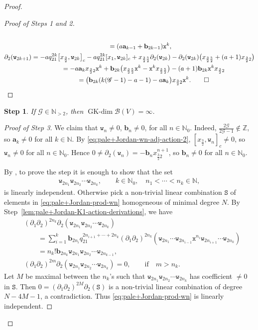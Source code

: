 \documentclass[10pt,a4paper]{amsart}
\providecommand{\qed}{\ensuremath{\square}}
\numberwithin{equation}{section}
\newtheorem{stepiv}{Step}
\newcommand{\GK}{\operatorname{GK-dim}}
\newcommand{\toba}{\mathscr B}
\newcommand{\ghost}{\mathscr{G}}
\newcommand{\ab}{\mathbf a}
\newcommand{\bb}{\mathbf b}
\newcommand{\N}{{\mathbb N}}
\newcommand{\Z}{{\mathbb Z}}
\newcommand{\wt}{\mathtt{w}}
\newcommand{\xt}{\mathtt{x}}
\newcommand{\tresdos}{\frac{3}{2}}
\newcommand{\cincodos}{\frac{5}{2}}
\begin{document}
\begin{proof}
\begin{proof}[Proof of Steps 1 and 2]
\begin{gather*}
\\\hphantom{\partial_{2} (\wt_{2k})}
{}= (a\ab_{k-1} +\bb_{2k-1}) \xt^{k},
\\
\partial_{2} (\wt_{2k+1}) =
-aq_{21}^{2k}\big[x_{\tresdos},\wt_{2k}\big]_c
-aq_{21}^{2k}[x_1,\wt_{2k}]_c
+x_{\tresdos\cincodos}\partial_2(\wt_{2k})
-\partial_2(\wt_{2k}) \big(x_{\tresdos\cincodos}+(a+1)x_{\tresdos2}\big)
\\ \hphantom{\partial_{2} (\wt_{2k+1})}
{} = -a\ab_k x_{\tresdos2}\xt^{k}
+\bb_{2k} \big(x_{\tresdos\cincodos}\xt^{k}-\xt^{k} x_{\tresdos\cincodos}\big)
-(a+1)\bb_{2k} \xt^{k}x_{\tresdos2}
\\ \hphantom{\partial_{2} (\wt_{2k+1})}
{} = \big(\bb_{2k} (k(\ghost-1)-a-1) -a\ab_k\big) x_{\tresdos2}\xt^{k}.
\tag*{\qed}
\end{gather*}
\renewcommand{\qed}{}
\end{proof}


\begin{stepiv}\label{prop:pale+Jordan}
If $\ghost\in\N_{>2}$, then $\GK \toba(V)=\infty$.
\end{stepiv}

\begin{proof}[Proof of Step 3]
We claim that
$\wt_n \ne 0$, $\bb_n \ne 0$, for all $n\in\N_0$.
Indeed, $\tfrac{2\ghost}{2\ghost-1}\notin\Z$, so $\ab_k\ne 0$ for all $k\in\N$.
By \eqref{eq:pale+Jordan-wn-adj-action-2}, $[x_{\tresdos},\wt_n]_c\ne 0$, so $\wt_n \ne 0$ for all $n\in\N_0$. Hence
$0\ne \partial_2(\wt_n)= -\bb_n x_{\tresdos2}^{n+1}$, so $\bb_{n}\ne 0$ for all $n\in\N_0$.

By \cite[Lemma~2.3.4]{AAH-triang}, to prove the step it is enough to show that the set
\begin{align}\label{eq:pale+Jordan-prod-wn}
 \wt_{2n_1}\wt_{2n_2}\cdots \wt_{2n_k},\qquad
 k\in\mathbb N_0, \quad n_1< \cdots< n_k \in\N,
\end{align}
is linearly independent.
Otherwise pick a non-trivial linear combination $\mathtt S$ of elements in \eqref{eq:pale+Jordan-prod-wn}
homogeneous of minimal degree $N$. By Step~\ref{lem:pale+Jordan-K1-action-derivations}, we have
\begin{align*}
&(\partial_1\partial_2)^{2n_k}\partial_2 (\wt_{2n_1}\wt_{2n_2}\cdots \wt_{2n_k})
\\
&\qquad{}= \sum_{i=1}^k \bb_{2n_i}q_{21}^{2n_{i+1}+\cdots +2n_k} (\partial_1\partial_2)^{2n_k} (\wt_{2n_1}\cdots \wt_{2n_{i-1}} \xt^{n_i}\wt_{2n_{i+1}}\cdots \wt_{2n_k})
\\
&\qquad{} = n_k! \bb_{2n_k} \wt_{2n_1}\wt_{2n_2}\cdots \wt_{2n_{k-1}},
\\
&(\partial_1\partial_2)^{2m}\partial_2 (\wt_{2n_1}\wt_{2n_2}\cdots \wt_{2n_k}) =0, \qquad
\text{if}\quad m>n_k.
\end{align*}
Let $M$ be maximal between the $n_k$'s such that $\wt_{2n_1}\wt_{2n_2}\cdots \wt_{2n_k}$ has
coefficient $\neq 0$ in $\mathtt S$.
Then $0=(\partial_1\partial_2)^{2M}\partial_2(\mathtt S)$ is a non-trivial linear combination of degree $N-4M-1$,
a contradiction. Thus \eqref{eq:pale+Jordan-prod-wn} is linearly independent.
\end{proof}


\end{proof}
\end{document}

